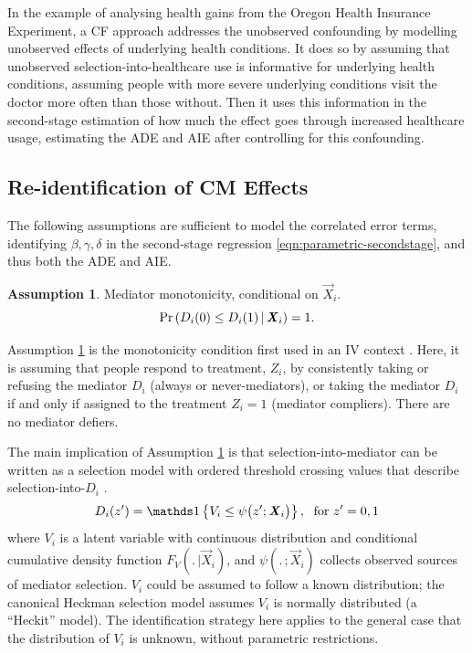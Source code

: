 In the example of analysing health gains from the Oregon Health Insurance Experiment, a CF approach addresses the unobserved confounding by modelling unobserved effects of underlying health conditions.
It does so by assuming that unobserved selection-into-healthcare use is informative for underlying health conditions, assuming people with more severe underlying conditions visit the doctor more often than those without.
Then it uses this information in the second-stage estimation of how much the effect goes through increased healthcare usage, estimating the ADE and AIE after controlling for this confounding.

\subsection{Re-identification of CM Effects}
The following assumptions are sufficient to model the correlated error terms, identifying $\beta, \gamma, \delta$ in the second-stage regression \eqref{eqn:parametric-secondstage}, and thus both the ADE and AIE.

\theoremstyle{definition}
\newtheorem{assumptionCF}{Assumption}
\renewcommand\theassumptionCF{CF--\arabic{assumptionCF}}
\begin{assumptionCF}
    \label{cf:monotonicity}
    Mediator monotonicity, conditional on $\vec X_i$.
    \[ \Pr\left(  D_i(0) \leq D_i(1)  \, \middle\vert \, \boldsymbol{\mathit{X}}_i \right) = 1. \]
\end{assumptionCF}
\noindent
Assumption \ref{cf:monotonicity} is the monotonicity condition first used in an IV context \citep{imbens1994identification}.
Here, it is assuming that people respond to treatment, $Z_i$, by consistently taking or refusing the mediator $D_i$ (always or never-mediators), or taking the mediator $D_i$ if and only if assigned to the treatment $Z_i=1$ (mediator compliers).
There are no mediator defiers.

The main implication of Assumption \ref{cf:monotonicity} is that selection-into-mediator can be written as a selection model with ordered threshold crossing values that describe selection-into-$D_i$ \citep{vytlacil2002independence}.
\[ D_i(z') = \indicator{V_i \leq \psi \big( z'; \vec X_i \big)},
    \;\text{ for } z'=0,1 \]
where $V_i$ is a latent variable with continuous distribution and conditional cumulative density function $F_V(. \,|\vec X_i)$, and $\psi(. \,;\vec X_i)$ collects observed sources of mediator selection.
$V_i$ could be assumed to follow a known distribution; the canonical Heckman selection model assumes $V_i$ is normally distributed (a ``Heckit'' model).
The identification strategy here applies to the general case that the distribution of $V_i$ is unknown, without parametric restrictions.


